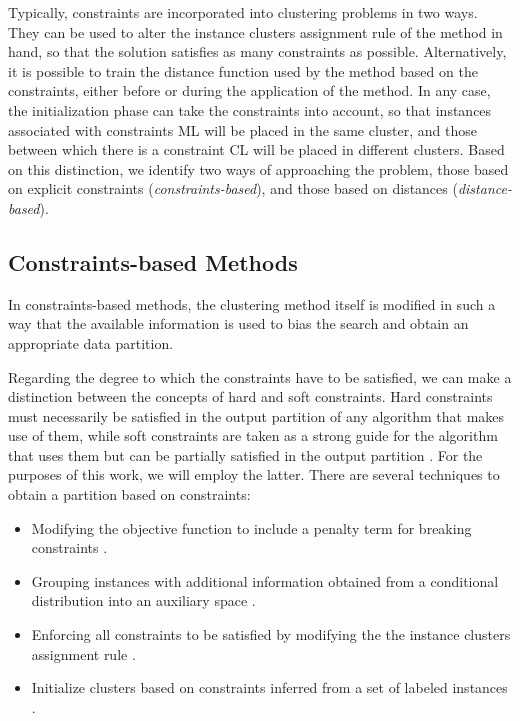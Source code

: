 Typically, constraints are incorporated into clustering problems in two ways. They can be used to alter the instance clusters assignment rule of the method in hand, so that the solution satisfies as many constraints as possible. Alternatively, it is possible to train the distance function used by the method based on the constraints, either before or during the application of the method. In any case, the initialization phase can take the constraints into account, so that instances associated with constraints \acs{ML} will be placed in the same cluster, and those between which there is a constraint \acs{CL} will be placed in different clusters. Based on this distinction, we identify two ways of approaching the problem, those based on explicit constraints (\textit{constraints-based}), and those based on distances (\textit{distance-based}).

\subsection{Constraints-based Methods}

In constraints-based methods, the clustering method itself is modified in such a way that the available information is used to bias the search and obtain an appropriate data partition.

Regarding the degree to which the constraints have to be satisfied, we can make a distinction between the concepts of hard \cite{wagstaff2001constrained,davidson2005agglomerative} and soft \cite{law2004clustering,basu2004active,segal2003discovering,davidson2005clustering,law2005model} constraints. Hard constraints must necessarily be satisfied in the output partition of any algorithm that makes use of them, while soft constraints are taken as a strong guide for the algorithm that uses them but can be partially satisfied in the output partition \cite{seret2014new}. For the purposes of this work, we will employ the latter. There are several techniques to obtain a partition based on constraints:

\begin{itemize}
	
	\item  Modifying the objective function to include a penalty term for breaking constraints \cite{demiriz1999semi,davidson2005clustering}.
	
	\item Grouping instances with additional information obtained from a conditional distribution into an auxiliary space \cite{sinkkonen2000semisupervised}.
	
	\item Enforcing all constraints to be satisfied by modifying the the instance clusters assignment rule \cite{wagstaff2001constrained}.
	
	\item Initialize clusters based on constraints inferred from a set of labeled instances \cite{basu2002semi}.
	
\end{itemize}

